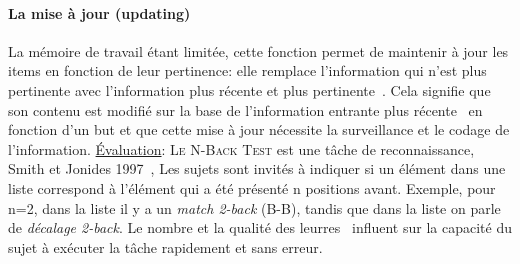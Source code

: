         \paragraph{La mise à jour (updating)}
            La mémoire de travail étant limitée, cette fonction permet de maintenir à jour les items en fonction de leur pertinence: elle remplace l'information qui n'est plus pertinente avec l'information plus récente et plus pertinente~. Cela signifie que son contenu est modifié sur la base de l'information entrante plus récente~ en fonction d'un but et que cette mise à jour nécessite la surveillance et le codage de l'information.
            \underline{Évaluation}:
            \textsc{Le N-Back Test}
                est une tâche de reconnaissance, Smith et Jonides 1997~, Les sujets sont invités à indiquer si un élément dans une liste correspond à l'élément qui a été présenté n positions avant. Exemple, pour n=2, dans la liste  il y a un \textit{match 2-back} (B-B), tandis que dans la liste  on parle de \textit{décalage 2-back}. Le nombre et la qualité des leurres~ influent sur la capacité du sujet à exécuter la tâche rapidement et sans erreur.
